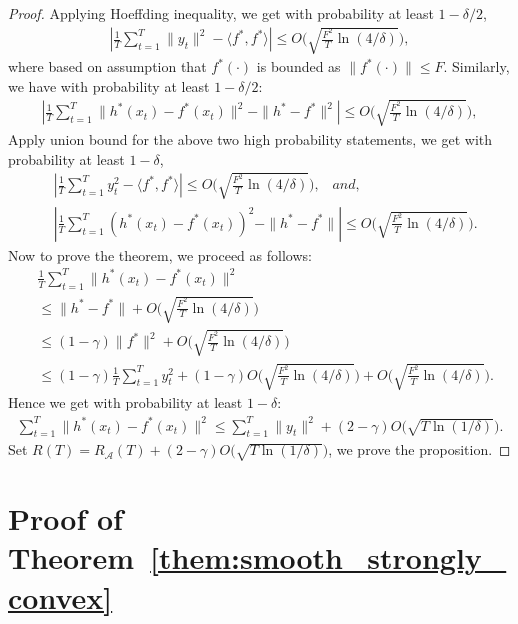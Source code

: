 \begin{proof}
Applying Hoeffding inequality, we get with probability at least $1-\delta/2$,
\begin{align}
\label{eq:high_prob_1}
|\frac{1}{T}\sum_{t=1}^T \|y_t\|^2 - \langle f^*, f^*\rangle| \leq O\big(\sqrt{\frac{F^2}{T}\ln(4/\delta)}\Big),
\end{align} where based on assumption that $f^*(\cdot)$ is bounded as $\|f^*(\cdot)\|\leq F$. Similarly, we have with probability at least $1-\delta/2$:
\begin{align}
|\frac{1}{T}\sum_{t=1}^T \|h^*(x_t) - f^*(x_t)\|^2 - \|h^* - f^* \|^2| \leq O\Big(\sqrt{\frac{F^2}{T}\ln(4/\delta)}\Big),
\end{align}
Apply union bound for the above two high probability statements, we get with probability at least $1-\delta$,
\begin{align}
&|\frac{1}{T}\sum_{t=1}^T y_t^2 - \langle f^*, f^*\rangle| \leq O\Big(\sqrt{\frac{F^2}{T}\ln(4/\delta)}\Big), \;\;\; and,\nonumber\\
&|\frac{1}{T}\sum_{t=1}^T (h^*(x_t) - f^*(x_t))^2 - \|h^* - f^* \|| \leq O\Big(\sqrt{\frac{F^2}{T}\ln(4/\delta)}\Big). 
\end{align} Now to prove the theorem, we proceed as follows:
\begin{align}
&\frac{1}{T}\sum_{t=1}^T \|h^*(x_t) - f^*(x_t)\|^2 \nonumber\\
&\leq  \|h^* - f^* \| + O\Big(\sqrt{\frac{F^2}{T}\ln(4/\delta)}\Big)\nonumber\\
&\leq (1-\gamma)\|f^*\|^2+O\Big(\sqrt{\frac{F^2}{T}\ln(4/\delta)}\Big)\nonumber\\
&\leq (1-\gamma)\frac{1}{T}\sum_{t=1}^T y_t^2 + (1-\gamma)O\Big(\sqrt{\frac{F^2}{T}\ln(4/\delta)}\Big) + O\Big(\sqrt{\frac{F^2}{T}\ln(4/\delta)}\Big).
\end{align} Hence we get with probability at least $1-\delta$:
\begin{align}
\sum_{t=1}^T \|h^*(x_t) - f^*(x_t)\|^2 \leq \sum_{t=1}^T \|y_t\|^2 + (2-\gamma)O\Big(\sqrt{ T\ln(1/\delta)}\Big).
\end{align} Set $R(T) = R_{\mathcal{A}}(T) + (2-\gamma)O\Big(\sqrt{ T\ln(1/\delta)}\Big)$, we prove the proposition. 
\end{proof}




\section{Proof of Theorem~\ref{them:smooth_strongly_convex}}
\label{sec:proof_smooth_strongly_convex}


